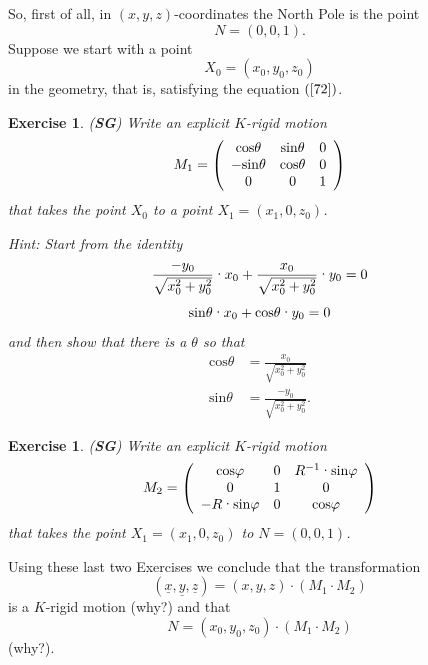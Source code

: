 \documentclass{article}%
\newtheorem{exercise}[theorem]{Exercise}
\begin{document}
So, first of all, in $\left(  x,y,z\right)  $-coordinates the North Pole is
the point%
\[
N=\left(  0,0,1\right)  .
\]
Suppose we start with a point%
\[
X_{0}=\left(  x_{0},y_{0},z_{0}\right)
\]
in the geometry, that is, satisfying the equation $\left(  \ref{72}\right)  $.

\begin{exercise}
(\textbf{SG}) Write an explicit $K$-rigid motion%
\[
M_{1}=\left(
\begin{array}
[c]{ccc}%
\mathrm{cos}\theta & \mathrm{sin}\theta & 0\\
-\mathrm{sin}\theta & \mathrm{cos}\theta & 0\\
0 & 0 & 1
\end{array}
\right)
\]
that takes the point $X_{0}$ to a point $X_{1}=\left(  x_{1},0,z_{0}\right)  $.

Hint: Start from the identity%
\[
\frac{-y_{0}}{\sqrt{x_{0}^{2}+y_{0}^{2}}}\text{\textperiodcentered}x_{0}%
+\frac{x_{0}}{\sqrt{x_{0}^{2}+y_{0}^{2}}}\text{\textperiodcentered}y_{0}=0
\]%
\[
\mathrm{sin}\theta\text{\textperiodcentered}x_{0}+\mathrm{cos}\theta
\text{\textperiodcentered}y_{0}=0
\]
and then show that there is a $\theta$ so that%
\begin{align*}
\mathrm{cos}\theta &  =\frac{x_{0}}{\sqrt{x_{0}^{2}+y_{0}^{2}}}\\
\mathrm{sin}\theta &  =\frac{-y_{0}}{\sqrt{x_{0}^{2}+y_{0}^{2}}}.
\end{align*}

\end{exercise}

\begin{exercise}
(\textbf{SG}) Write an explicit $K$-rigid motion%
\[
M_{2}=\left(
\begin{array}
[c]{ccc}%
\mathrm{cos}\varphi & 0 & R^{-1}\text{\textperiodcentered}\mathrm{sin}%
\varphi\\
0 & 1 & 0\\
-R\text{\textperiodcentered}\mathrm{sin}\varphi & 0 & \mathrm{cos}\varphi
\end{array}
\right)
\]
that takes the point $X_{1}=\left(  x_{1},0,z_{0}\right)  $ to $N=\left(
0,0,1\right)  $.
\end{exercise}

Using these last two Exercises we conclude that the transformation%
\[
\left(  \underline{x},\underline{y},\underline{z}\right)  =\left(
x,y,z\right)  \cdot\left(  M_{1}\cdot M_{2}\right)
\]
is a $K$-rigid motion (why?) and that%
\[
N=\left(  x_{0},y_{0},z_{0}\right)  \cdot\left(  M_{1}\cdot M_{2}\right)
\]
(why?).
\end{document}
